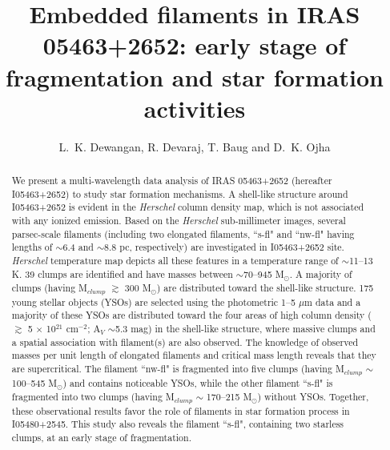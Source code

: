 \documentclass[iop]{emulateapj}
\begin{document}
\title{Embedded filaments in IRAS 05463+2652: early stage of fragmentation and star formation activities}
\author{L.~K. Dewangan, R. Devaraj, T. Baug and D.~K. Ojha}
%
\begin{abstract}
%
%
We present a multi-wavelength data analysis of IRAS 05463+2652 (hereafter I05463+2652) to study star formation mechanisms.
A shell-like structure around I05463+2652 is evident in the {\it Herschel} column density map, which is not associated with any ionized emission. 
Based on the {\it Herschel} sub-millimeter images, several parsec-scale filaments (including two elongated filaments, ``s-fl" and ``nw-fl" having lengths of $\sim$6.4 and $\sim$8.8 pc, respectively) are investigated in I05463+2652 site. {\it Herschel} temperature map depicts all these features in a temperature range of $\sim$11--13 K.
39 clumps are identified and have masses between $\sim$70--945 M$_{\odot}$. 
A majority of clumps (having M$_{clump}$ $\gtrsim$ 300 M$_{\odot}$) are distributed toward the shell-like structure. 
175 young stellar objects (YSOs) are selected using the photometric 1--5 $\mu$m data and a majority of these YSOs are distributed toward the four areas of high column 
density ($\gtrsim$ 5 $\times$ 10$^{21}$ cm$^{-2}$; A$_{V}$ $\sim$5.3 mag) in the shell-like structure,
where massive clumps and a spatial association with filament(s) are also observed.  
The knowledge of observed masses per unit length of elongated filaments and critical mass length reveals that they are supercritical.
The filament ``nw-fl" is fragmented into five clumps (having M$_{clump}$ $\sim$100--545 M$_{\odot}$) and contains noticeable YSOs, 
while the other filament ``s-fl" is fragmented into two clumps (having M$_{clump}$ $\sim$ 170--215 M$_{\odot}$) without YSOs. 
Together, these observational results favor the role of filaments in star formation process in I05480+2545. 
This study also reveals the filament ``s-fl", containing two starless clumps, at an early stage of fragmentation. 
%
\end{abstract}
%
\end{document}
